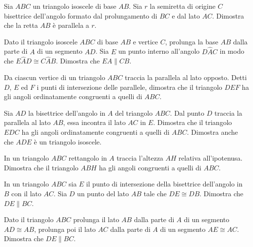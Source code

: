 \begin{multicols}{2}
\begin{esercizio}
\label{ese:3.28}
Sia \(ABC\) un triangolo isoscele di base \(AB\). Sia \(r\) la semiretta di 
origine \(C\) bisettrice dell'angolo formato dal prolungamento di \(BC\) 
e dal lato \(AC\). Dimostra che la retta \(AB\) è parallela a \(r\).
\end{esercizio}

\begin{esercizio}
\label{ese:3.29}
Dato il triangolo isoscele \(ABC\) di base \(AB\) e vertice \(C\), prolunga 
la base \(AB\) dalla parte di \(A\) di un segmento \(AD\). Sia \(E\) un punto 
interno all'angolo \(D\widehat{A}C\) in modo che \(E\widehat{A}D\cong 
C\widehat{A}B\). Dimostra che \(EA\parallel CB\).
\end{esercizio}

\begin{esercizio}
\label{ese:3.30}
Da ciascun vertice di un triangolo \(ABC\) traccia la parallela al lato 
opposto. Detti \(D\), \(E\) ed \(F\) i punti di intersezione delle 
parallele, dimostra che il triangolo \(DEF\) ha gli angoli 
ordinatamente congruenti a quelli di \(ABC\).
\end{esercizio}

\begin{esercizio}
\label{ese:3.31}
Sia \(AD\) la bisettrice dell'angolo in \(A\) del triangolo \(ABC\). Dal 
punto \(D\) traccia la parallela al lato \(AB\), essa incontra il lato 
\(AC\) in \(E\). Dimostra che il triangolo \(EDC\) ha gli angoli 
ordinatamente congruenti a quelli di \(ABC\). Dimostra anche che \(ADE\) 
è un triangolo isoscele.
\end{esercizio}

\begin{esercizio}
\label{ese:3.32}
In un triangolo \(ABC\) rettangolo in \(A\) traccia l'altezza \(AH\) 
relativa all'ipotenusa. Dimostra che il triangolo \(ABH\) ha gli angoli 
congruenti a quelli di \(ABC\).
\end{esercizio}

\begin{esercizio}
\label{ese:3.35}
In un triangolo \(ABC\) sia \(E\) il punto di intersezione della 
bisettrice dell'angolo in \(B\) con il lato \(AC\). Sia \(D\) un punto del 
lato \(AB\) tale che \(DE\cong DB\). Dimostra che \(DE\parallel BC\).
\end{esercizio}

\begin{esercizio}
\label{ese:3.37}
Dato il triangolo \(ABC\) prolunga il lato \(AB\) dalla parte di \(A\) di 
un segmento \(AD\cong AB\), prolunga poi il lato \(AC\) dalla parte di \(A\) 
di un segmento \(AE\cong AC\). Dimostra che \(DE\parallel BC\).
\end{esercizio}


\end{multicols}
